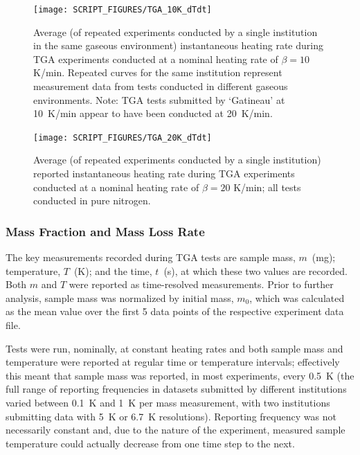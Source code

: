 \documentclass{book}
\begin{document}
\begin{figure}
  \centering
  \texttt{[image: SCRIPT\_FIGURES/TGA\_10K\_dTdt]}
  \caption{Average (of repeated experiments conducted by a single institution in the same gaseous environment) instantaneous heating rate during TGA experiments conducted at a nominal heating rate of $\beta=10$ K/min. Repeated curves for the same institution represent measurement data from tests conducted in different gaseous environments. Note: TGA tests submitted by ‘Gatineau’ at 10~K/min appear to have been conducted at 20~K/min.}
  \label{Fig:TGA_10K_dTdt}
\end{figure}

\begin{figure}
  \centering
  \texttt{[image: SCRIPT\_FIGURES/TGA\_20K\_dTdt]}
  \caption{Average (of repeated experiments conducted by a single institution) reported instantaneous heating rate during TGA experiments conducted at a nominal heating rate of $\beta=20$ K/min; all tests conducted in pure nitrogen.}
  \label{Fig:TGA_20K_dTdt}
\end{figure}


\subsubsection{Mass Fraction and Mass Loss Rate}

The key measurements recorded during TGA tests are sample mass, $m$~(mg); temperature, $T$~(K); and the time, $t$~(s), at which these two values are recorded.  Both $m$ and $T$ were reported as time-resolved measurements. Prior to further analysis, sample mass was normalized by initial mass, $m_0$, which was calculated as the mean value over the first 5 data points of the respective experiment data file.

Tests were run, nominally, at constant heating rates and both sample mass and temperature were reported at regular time or temperature intervals; effectively this meant that sample mass was reported, in most experiments, every 0.5~K (the full range of reporting frequencies in datasets submitted by different institutions varied between 0.1~K and 1~K per mass measurement, with two institutions submitting data with 5~K or 6.7~K resolutions). Reporting frequency was not necessarily constant and, due to the nature of the experiment, measured sample temperature could actually decrease from one time step to the next.
\end{document}
